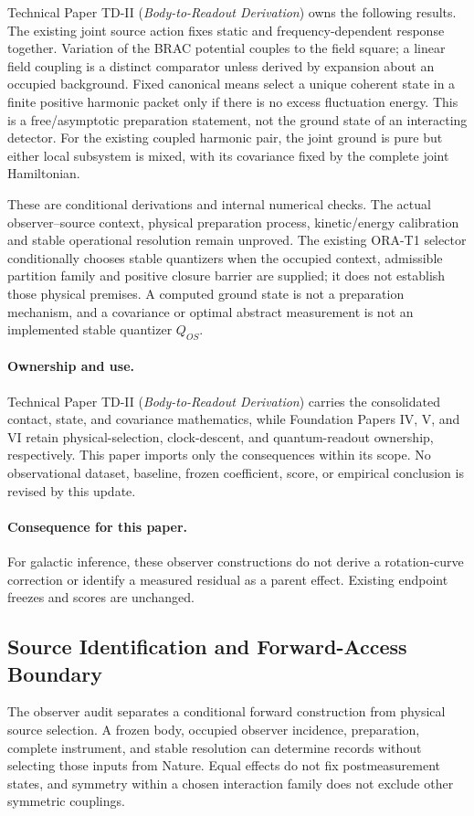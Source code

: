 \documentclass[11pt]{article}
\begin{document}
Technical Paper TD-II (\emph{Body-to-Readout Derivation}) owns the following
results. The existing joint source action fixes static and frequency-dependent
response together. Variation of the BRAC potential couples to the field
square; a linear field coupling is a distinct comparator unless derived by
expansion about an occupied background. Fixed canonical means select a unique
coherent state in a finite positive harmonic packet only if there is no excess
fluctuation energy. This is a free/asymptotic preparation statement, not the
ground state of an interacting detector. For the existing coupled harmonic
pair, the joint ground is pure but either local subsystem is mixed, with its
covariance fixed by the complete joint Hamiltonian.

These are conditional derivations and internal numerical checks. The actual
observer--source context, physical preparation process, kinetic/energy
calibration and stable operational resolution remain unproved. The existing
ORA-T1 selector conditionally chooses stable quantizers when the occupied
context, admissible partition family and positive closure barrier are supplied;
it does not establish those physical premises. A computed ground state is not
a preparation mechanism, and a covariance or optimal abstract measurement is
not an implemented stable quantizer $Q_{OS}$.

\paragraph{Ownership and use.}
Technical Paper TD-II (\emph{Body-to-Readout Derivation}) carries the consolidated
contact, state, and covariance mathematics, while Foundation Papers IV, V, and VI
retain physical-selection, clock-descent, and quantum-readout ownership,
respectively. This paper imports only the consequences within its scope. No
observational dataset, baseline, frozen coefficient, score, or empirical
conclusion is revised by this update.

\paragraph{Consequence for this paper.}
For galactic inference, these observer constructions do not derive a rotation-curve correction or identify a measured residual as a parent effect. Existing endpoint freezes and scores are unchanged.

\subsection{Source Identification and Forward-Access Boundary}
The observer audit separates a conditional forward construction from physical source selection. A frozen body, occupied observer incidence, preparation, complete instrument, and stable resolution can determine records without selecting those inputs from Nature. Equal effects do not fix postmeasurement states, and symmetry within a chosen interaction family does not exclude other symmetric couplings.
\end{document}
